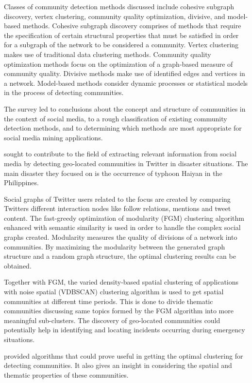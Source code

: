 Classes of community detection methods discussed include cohesive subgraph discovery, vertex clustering, community quality optimization, divisive, and model-based methods. Cohesive subgraph discovery comprises of methods that require the specification of certain structural properties that must be satisfied in order for a subgraph of the network to be considered a community. Vertex clustering makes use of traditional data clustering methods. Community quality optimization methods focus on the optimization of a graph-based measure of community quality. Divisive methods make use of identified edges and vertices in a network. Model-based methods consider dynamic processes or statistical models in the process of detecting communities.


The survey led to conclusions about the concept and structure of communities in the context of social media, to a rough classification of existing community detection methods, and to determining which methods are most appropriate for social media mining applications.


 sought to contribute to the field of extracting relevant information from social media by detecting geo-located communities in Twitter in disaster situations. The main disaster they focused on is the occurrence of typhoon Haiyan in the Philippines. 


Social graphs of Twitter users related to the focus are created by comparing Twitter\vtick s different interaction nodes like follow relations, mentions and tweet content. The fast-greedy optimization of modularity (FGM) clustering algorithm enhanced with semantic similarity is used in order to handle the complex social graphs created. Modularity measures the quality of divisions of a network into communities. By maximizing the modularity between the generated graph structure and a random graph structure, the optimal clustering results can be obtained. 


Together with FGM, the varied density-based spatial clustering of applications with noise spatial (VDBSCAN) clustering algorithm is used to get spatial communities at different time periods. This is done to divide thematic communities discussing same topics formed by the FGM algorithm into more meaningful sub-clusters. The discovery of geo-located communities could potentially help in identifying and locating incidents occurring during emergency situations.


 provided algorithms that could prove useful in getting the optimal clustering for detecting communities. It also gives an insight in considering the spatial and thematic properties of these communities.


